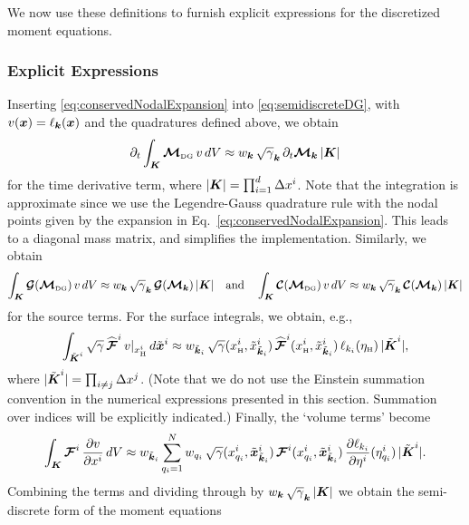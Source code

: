 \documentclass[10pt,preprint]{aastex}
\begin{document}
We now use these definitions to furnish explicit expressions for the discretized moment equations.  

\subsubsection{Explicit Expressions}

Inserting \eqref{eq:conservedNodalExpansion} into \eqref{eq:semidiscreteDG}, with $v(\boldsymbol{x})=\ell_{\boldsymbol{k}}(\boldsymbol{x})$ and the quadratures defined above, we obtain
\begin{equation}
  \partial_{t}{}\int_{\boldsymbol{K}}\boldsymbol{\mathcal{M}}_{\mbox{\tiny DG}}\,v\,dV
  \approx w_{\boldsymbol{k}}\,\sqrt{\gamma}_{\boldsymbol{k}}\,\partial_{t}{}\boldsymbol{\mathcal{M}}_{\boldsymbol{k}}\,|\boldsymbol{K}|
\end{equation}
for the time derivative term, where $|\boldsymbol{K}|=\prod_{i=1}^{d}\Delta x^{i}$.  
Note that the integration is approximate since we use the Legendre-Gauss quadrature rule with the nodal points given by the expansion in Eq.~\eqref{eq:conservedNodalExpansion}.  
This leads to a diagonal mass matrix, and simplifies the implementation.  
Similarly, we obtain
\begin{equation}
  \int_{\boldsymbol{K}}\boldsymbol{\mathcal{G}}(\boldsymbol{\mathcal{M}}_{\mbox{\tiny DG}})\,v\,dV
  \approx w_{\boldsymbol{k}}\,\sqrt{\gamma}_{\boldsymbol{k}}\,\boldsymbol{\mathcal{G}}(\boldsymbol{\mathcal{M}}_{\boldsymbol{k}})\,|\boldsymbol{K}| \quad\text{and}\quad
  \int_{\boldsymbol{K}}\boldsymbol{\mathcal{C}}(\boldsymbol{\mathcal{M}}_{\mbox{\tiny DG}})\,v\,dV
  \approx w_{\boldsymbol{k}}\,\sqrt{\gamma}_{\boldsymbol{k}}\,\boldsymbol{\mathcal{C}}(\boldsymbol{\mathcal{M}}_{\boldsymbol{k}})\,|\boldsymbol{K}|
\end{equation}
for the source terms.  
For the surface integrals, we obtain, e.g., 
\begin{equation}
  \int_{\tilde{\boldsymbol{K}}^{i}}\sqrt{\gamma}\,\widehat{\boldsymbol{\mathcal{F}}}^{i}\,v|_{x_{\mbox{\tiny H}}^{i}}\,d\tilde{\boldsymbol{x}}^{i}
  \approx w_{\tilde{\boldsymbol{k}}_{i}}\,\sqrt{\gamma}(x_{\mbox{\tiny H}}^{i},\tilde{x}_{\tilde{\boldsymbol{k}}_{i}}^{i})\,
  \widehat{\boldsymbol{\mathcal{F}}}^{i}(x_{\mbox{\tiny H}}^{i},\tilde{x}_{\tilde{\boldsymbol{k}}_{i}}^{i})\,\ell_{k_{i}}(\eta_{\mbox{\tiny H}})\,|\tilde{\boldsymbol{K}}^{i}|,
\end{equation}
where $|\tilde{\boldsymbol{K}}^{i}|=\prod_{i\ne j}\Delta x^{j}$.  
(Note that we do not use the Einstein summation convention in the numerical expressions presented in this section.  
Summation over indices will be explicitly indicated.)  
Finally, the `volume terms' become
\begin{equation}
  \int_{\boldsymbol{K}}\boldsymbol{\mathcal{F}}^{i}\,\frac{\partial v}{\partial x^{i}}\,dV
  \approx w_{\tilde{\boldsymbol{k}}_{i}}\sum_{q_{i}=1}^{N}w_{q_{i}}\,\sqrt{\gamma}(x_{q_{i}}^{i},\tilde{\boldsymbol{x}}_{\tilde{\boldsymbol{k}}_{i}}^{i})\,
  \boldsymbol{\mathcal{F}}^{i}(x_{q_{i}}^{i},\tilde{\boldsymbol{x}}_{\tilde{\boldsymbol{k}}_{i}}^{i})\,\frac{\partial \ell_{k_{i}}}{\partial \eta^{i}}(\eta_{q_{i}}^{i})\,|\tilde{\boldsymbol{K}}^{i}|.  
\end{equation}
Combining the terms and dividing through by $w_{\boldsymbol{k}}\,\sqrt{\gamma}_{\boldsymbol{k}}\,|\boldsymbol{K}|$ we obtain the semi-discrete form of the moment equations
\end{document}
